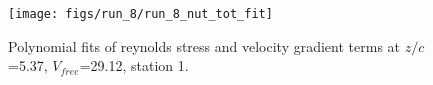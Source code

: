 \begin{figure}[H]
\centering
\texttt{[image: figs/run\_8/run\_8\_nut\_tot\_fit]}
\caption{Polynomial fits of reynolds stress and velocity gradient terms at $z/c$=5.37, $V_{free}$=29.12, station 1.}
\label{fig:run_8_nut_tot_fit}
\end{figure}


